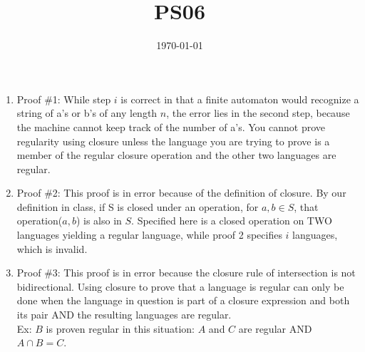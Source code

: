 \documentclass{article}
\title{PS06}
\date{\today}
\begin{document}
\maketitle

\begin{enumerate}[label=\alph*.]
	\item Proof \#1: While step $i$ is correct in that a finite automaton would recognize a string of a's or b's of any length $n$, the error lies in the second step, because the machine cannot keep track of the number of a's. You cannot prove regularity using closure unless the language you are trying to prove is a member of the regular closure operation and the other two languages are regular.
	\item Proof \#2: This proof is in error because of the definition of closure. By our definition in class, if S is closed under an operation, for $a, b \in S$, that operation($a,b$) is also in $S$. Specified here is a closed operation on TWO languages yielding a regular language, while proof 2 specifies $i$ languages, which is invalid.
	\item Proof \#3: This proof is in error because the closure rule of intersection is not bidirectional. Using closure to prove that a language is regular can only be done when the language in question is part of a closure expression and both its pair AND the resulting languages are regular. \\Ex: $B$ is proven regular in this situation: $A$ and $C$ are regular AND $A \cap B = C$.
\end{enumerate}
\end{document}
